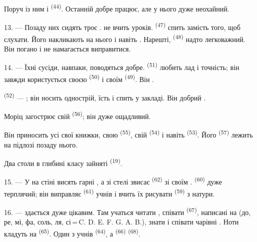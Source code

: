 Поруч із ним  і  \textsuperscript{(44)}. Останній
добре працює, але  у нього дуже неохайний.

13. --- Позаду них сидять троє .  не вчить
уроків.  \textsuperscript{(47)} спить замість того, щоб слухати.
Його  накликають на нього  і навіть
. Нарешті,  \textsuperscript{(48)} надто
легковажний. Він погано  і не намагається виправитися.

14. --- Їхні сусіди, навпаки, поводяться добре. 
\textsuperscript{(51)} любить лад і точність; він завжди користується своєю
 \textsuperscript{(50)} і своїм 
\textsuperscript{(49)}. Він .

 \textsuperscript{(52)} --- ; він носить
однострій, їсть і спить у закладі. Він добрий .

Моріц загострює свій  
\textsuperscript{(56)}; він дуже ощадливий.

Він приносить усі свої книжки, свою  \textsuperscript{(55)},
свій  \textsuperscript{(54)} і навіть 
\textsuperscript{(53)}. Його  \textsuperscript{(57)} лежить на
підлозі позаду нього.

Два столи в глибині класу зайняті 
\textsuperscript{(19)}.

\VUsaut{4.6mm}
\VUsaut{3.4mm}

15. --- У  на стіні висять гарні , а зі
стелі звисає  \textsuperscript{(62)} зі своїм .
 \textsuperscript{(60)} дуже терплячий; він виправляє
 \textsuperscript{(61)} учнів і вчить їх рисувати
 \textsuperscript{(59)} з натури.

16. ---  здається дуже цікавим. Там учаться читати
, співати  \textsuperscript{(67)}, написані на
 (до, ре, мі, фа, соль, ля, сі\,=\,C. D. E. F. G. A. B.),
знати  і співати чарівні . Ноти кладуть на
 \textsuperscript{(65)}. Один з учнів 
\textsuperscript{(64)}, а  \textsuperscript{(66)}
 \textsuperscript{(68)}.

